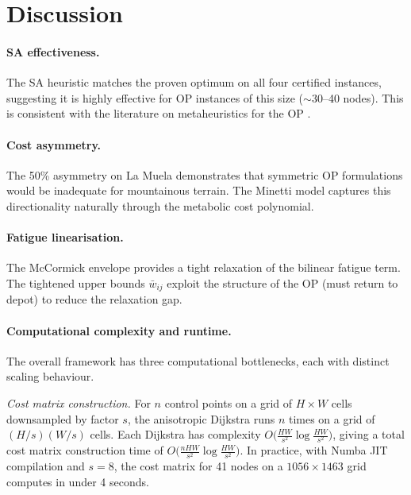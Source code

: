 \documentclass[11pt,a4paper]{article}
\begin{document}
\section{Discussion}
\label{sec:discussion}

\paragraph{SA effectiveness.}
The SA heuristic matches the proven optimum on all four certified instances, suggesting it is highly effective for OP instances of this size ($\sim$30--40 nodes).
This is consistent with the literature on metaheuristics for the OP \citep{vansteenwegen2011orienteering}.

\paragraph{Cost asymmetry.}
The 50\% asymmetry on La Muela demonstrates that symmetric OP formulations would be inadequate for mountainous terrain.
The Minetti model captures this directionality naturally through the metabolic cost polynomial.

\paragraph{Fatigue linearisation.}
The McCormick envelope provides a tight relaxation of the bilinear fatigue term.
The tightened upper bounds $\bar{w}_{ij}$ exploit the structure of the OP (must return to depot) to reduce the relaxation gap.

\paragraph{Computational complexity and runtime.}
The overall framework has three computational bottlenecks, each with distinct scaling behaviour.

\emph{Cost matrix construction.}
For $n$ control points on a grid of $H \times W$ cells downsampled by factor $s$, the anisotropic Dijkstra runs $n$ times on a grid of $(H/s)(W/s)$ cells.
Each Dijkstra has complexity $O\bigl(\frac{HW}{s^2} \log \frac{HW}{s^2}\bigr)$, giving a total cost matrix construction time of $O\bigl(\frac{nHW}{s^2} \log \frac{HW}{s^2}\bigr)$.
In practice, with Numba JIT compilation and $s = 8$, the cost matrix for 41 nodes on a $1056 \times 1463$ grid computes in under 4 seconds.
\end{document}
